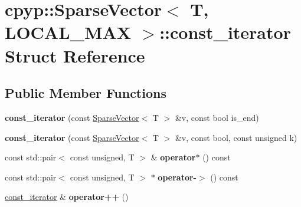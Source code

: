 \hypertarget{structcpyp_1_1_sparse_vector_1_1const__iterator}{}\section{cpyp\+:\+:Sparse\+Vector$<$ T, L\+O\+C\+A\+L\+\_\+\+M\+AX $>$\+:\+:const\+\_\+iterator Struct Reference}
\label{structcpyp_1_1_sparse_vector_1_1const__iterator}
\subsection*{Public Member Functions}
\begin{DoxyCompactItemize}
\item 
\mbox{\label{structcpyp_1_1_sparse_vector_1_1const__iterator_a0d541f36821675a6c1fe62001fbdf455}} 
{\bfseries const\+\_\+iterator} (const \mbox{\hyperlink{classcpyp_1_1_sparse_vector}{Sparse\+Vector}}$<$ T $>$ \&v, const bool is\+\_\+end)
\item 
\mbox{\label{structcpyp_1_1_sparse_vector_1_1const__iterator_aec0fc882ccff14a628b28ba8dd035d06}} 
{\bfseries const\+\_\+iterator} (const \mbox{\hyperlink{classcpyp_1_1_sparse_vector}{Sparse\+Vector}}$<$ T $>$ \&v, const bool, const unsigned k)
\item 
\mbox{\label{structcpyp_1_1_sparse_vector_1_1const__iterator_a968fe8cd37f05541abeb97ea5581d394}} 
const std\+::pair$<$ const unsigned, T $>$ \& {\bfseries operator$\ast$} () const
\item 
\mbox{\label{structcpyp_1_1_sparse_vector_1_1const__iterator_a1ff0c9b094fc4d67c63dd937563060ba}} 
const std\+::pair$<$ const unsigned, T $>$ $\ast$ {\bfseries operator-\/$>$} () const
\item 
\mbox{\label{structcpyp_1_1_sparse_vector_1_1const__iterator_a068c2415275bab873f5bbd646b8d0792}} 
\mbox{\hyperlink{structcpyp_1_1_sparse_vector_1_1const__iterator}{const\+\_\+iterator}} \& {\bfseries operator++} ()

\end{DoxyCompactItemize}
